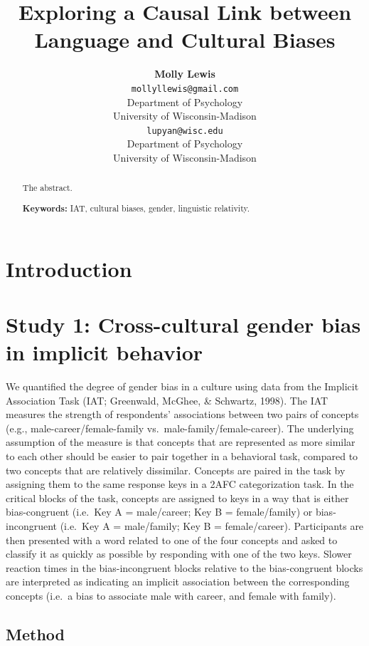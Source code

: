 \documentclass[10pt, letterpaper]{article}
\title{Exploring a Causal Link between Language and Cultural Biases}
\author{{\large \bf Molly Lewis} \\ \texttt{mollyllewis@gmail.com} \\ Department of Psychology  \\ University of Wisconsin-Madison \And {\large \bf Gary Lupyan} \\ \texttt{lupyan@wisc.edu} \\ Department of Psychology  \\ University of Wisconsin-Madison}
\begin{document}
\maketitle

\begin{abstract}
The abstract.

\textbf{Keywords:}
IAT, cultural biases, gender, linguistic relativity.
\end{abstract}

\section{Introduction}\label{introduction}

\section{Study 1: Cross-cultural gender bias in implicit
behavior}\label{study-1-cross-cultural-gender-bias-in-implicit-behavior}

We quantified the degree of gender bias in a culture using data from the
Implicit Association Task (IAT; Greenwald, McGhee, \& Schwartz, 1998).
The IAT measures the strength of respondents' associations between two
pairs of concepts (e.g., male-career/female-family
vs.~male-family/female-career). The underlying assumption of the measure
is that concepts that are represented as more similar to each other
should be easier to pair together in a behavioral task, compared to two
concepts that are relatively dissimilar. Concepts are paired in the task
by assigning them to the same response keys in a 2AFC categorization
task. In the critical blocks of the task, concepts are assigned to keys
in a way that is either bias-congruent (i.e.~Key A = male/career; Key B
= female/family) or bias-incongruent (i.e.~Key A = male/family; Key B =
female/career). Participants are then presented with a word related to
one of the four concepts and asked to classify it as quickly as possible
by responding with one of the two keys. Slower reaction times in the
bias-incongruent blocks relative to the bias-congruent blocks are
interpreted as indicating an implicit association between the
corresponding concepts (i.e.~a bias to associate male with career, and
female with family).

\subsection{Method}\label{method}
\end{document}
